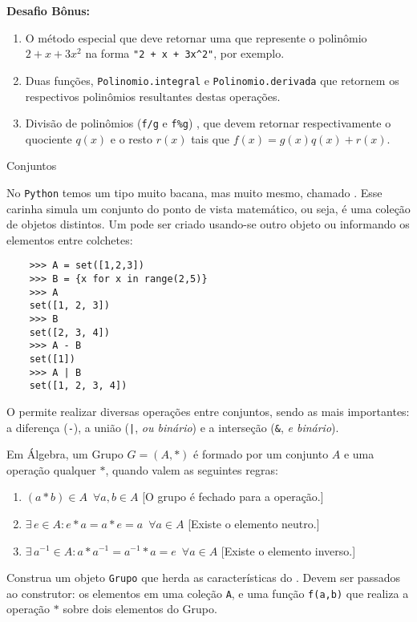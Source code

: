 \documentclass[12pt]{article}
\begin{document}
	\textbf{Desafio Bônus:}
	\begin{enumerate}
		\item O método especial  que deve retornar uma  que represente o polinômio $2 + x + 3x^{2}$ na forma \texttt{"2 + x + 3x\^{}2"}, por exemplo.
		\item Duas funções, \texttt{Polinomio.integral} e \texttt{Polinomio.derivada} que retornem os respectivos polinômios resultantes destas operações.
		
		\item Divisão de polinômios (\texttt{f/g} e \texttt{f\%g}) , que devem retornar respectivamente o quociente $q(x)$ e o resto $r(x)$ tais que $f(x) = g(x) q(x) + r(x)$.
	\end{enumerate}
	
	
	\begin{interlude}{Conjuntos}
	
	No \texttt{Python} temos um tipo muito bacana, mas muito mesmo, chamado . Esse carinha simula um conjunto do ponto de vista matemático, ou seja, é uma coleção de objetos distintos. Um  pode ser criado usando-se outro objeto ou informando os elementos entre colchetes:
	
	\begin{lstlisting}
	>>> A = set([1,2,3])
	>>> B = {x for x in range(2,5)}
	>>> A
	set([1, 2, 3])
	>>> B
	set([2, 3, 4])
	>>> A - B
	set([1])
	>>> A | B
	set([1, 2, 3, 4])
	\end{lstlisting}
	
	O  permite realizar diversas operações entre conjuntos, sendo as mais importantes: a diferença (\texttt{-}), a união (\texttt{|}, \emph{ou binário}) e a interseção (\texttt{\&}, \emph{e binário}). 
	
	\end{interlude}
	
	Em Álgebra, um Grupo $G = (A, \ast)$ é formado por um conjunto $A$ e uma operação qualquer $\ast$, quando valem as seguintes regras:
	
	\begin{enumerate}
		\item $(a \ast b) \in A \,\,\, \forall a,b \in A$ [O grupo é fechado para a operação.]
		\item $\exists \, e \in A : e \ast a = a \ast e = a \,\,\, \forall a \in A$ [Existe o elemento neutro.]
		\item $\exists \, a^{-1} \in A : a \ast a^{-1} = a^{-1} \ast a = e \,\,\, \forall a \in A$ [Existe o elemento inverso.]\\
	\end{enumerate}
	Construa um objeto \texttt{Grupo} que herda as características do . Devem ser passados ao construtor: os elementos em uma coleção \texttt{A}, e uma função \texttt{f(a,b)} que realiza a operação $\ast$ sobre dois elementos do Grupo.
	
\end{document}
